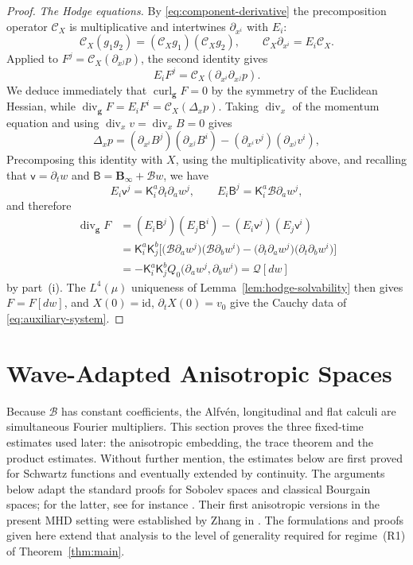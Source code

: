 \documentclass[11pt,reqno]{amsart}
\theoremstyle{plain}
\theoremstyle{definition}
\theoremstyle{remark}
\numberwithin{equation}{section}
\DeclareMathOperator{\Div}{div}
\DeclareMathOperator{\curl}{curl}
\newcommand{\Kmat}{\mathsf K}
\newcommand{\vLag}{\mathsf v}
\newcommand{\BLag}{\mathsf B}
\newcommand{\gmetric}{\mathbf g}
\newcommand{\Binf}{\mathbf B_\infty}
\begin{document}
\begin{proof}
\emph{The Hodge equations.}  By \eqref{eq:component-derivative} the precomposition operator
$\mathcal C_X$ is multiplicative and intertwines $\partial_{x^i}$ with $E_i$:
\[
 \mathcal C_X(g_1g_2)=(\mathcal C_Xg_1)(\mathcal C_Xg_2),
 \qquad
 \mathcal C_X\partial_{x^i}=E_i\mathcal C_X .
\]
Applied to $F^j=\mathcal C_X(\partial_{x^j}p)$, the second identity gives
\[
    E_iF^j=\mathcal C_X(\partial_{x^i}\partial_{x^j}p).
\]
We deduce immediately that $\curl_{\gmetric}F=0$ by
the symmetry of the Euclidean Hessian, while
$\Div_{\gmetric}F=E_iF^i=\mathcal C_X(\Delta_xp)$.  Taking $\Div_x$ of the
momentum equation and using $\Div_xv=\Div_xB=0$ gives
\[
 \Delta_xp=(\partial_{x^i}B^j)(\partial_{x^j}B^i)
           -(\partial_{x^i}v^j)(\partial_{x^j}v^i) ,
\]
Precomposing this identity with $X$, using the multiplicativity above, and
recalling that $\vLag=\partial_tw$ and $\BLag=\Binf+\mathcal Bw$, we have
\[
 E_i\vLag^j=\Kmat^a_i\partial_t\partial_aw^j ,
 \qquad
 E_i\BLag^j=\Kmat^a_i\mathcal B\partial_aw^j ,
\]
and therefore
\begin{align*}
 \Div_{\gmetric}F
 &=(E_i\BLag^j)(E_j\BLag^i)-(E_i\vLag^j)(E_j\vLag^i)\\
 &=\Kmat^a_i\Kmat^b_j\Big[
     \big(\mathcal B\partial_aw^j\big)\big(\mathcal B\partial_bw^i\big)
    -\big(\partial_t\partial_aw^j\big)\big(\partial_t\partial_bw^i\big)\Big]\\
 &=-\Kmat^a_i\Kmat^b_jQ_0\big(\partial_aw^j,\partial_bw^i\big)
  =\mathcal Q[dw]
\end{align*}
by part~(i).  The $L^4(\mu)$ uniqueness of Lemma~\ref{lem:hodge-solvability}
then gives $F=F[dw]$, and $X(0)=\mathrm{id}$, $\partial_tX(0)=v_0$ give the
Cauchy data of \eqref{eq:auxiliary-system}.
\end{proof}
 


\section{Wave-Adapted Anisotropic Spaces}
\label{sec:anisotropic-spaces}

Because $\mathcal B$ has constant coefficients, the Alfv\'en, longitudinal and flat calculi are
simultaneous Fourier multipliers. This section proves the three fixed-time estimates used later: the
anisotropic embedding, the trace theorem and the product estimates. Without further mention, the estimates below are first proved for Schwartz functions and eventually extended by continuity. The arguments below adapt the standard proofs for Sobolev spaces and classical
Bourgain spaces; for the latter, see for instance
\cite{Tao2006Dispersive}. Their first anisotropic versions in the present MHD
setting were established by Zhang in \cite{Zhang2024}. The formulations and
proofs given here extend that analysis to the level of generality required for
regime~\textup{(R1)} of Theorem~\ref{thm:main}.
\end{document}
